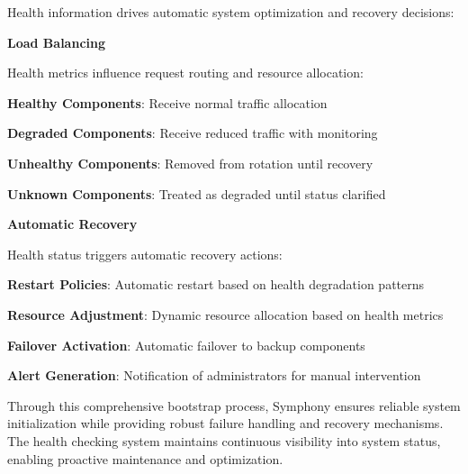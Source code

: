 Health information drives automatic system optimization and recovery decisions:

\textbf{Load Balancing}

Health metrics influence request routing and resource allocation:

\begin{compactlist}
    \item \textbf{Healthy Components}: Receive normal traffic allocation
    \item \textbf{Degraded Components}: Receive reduced traffic with monitoring
    \item \textbf{Unhealthy Components}: Removed from rotation until recovery
    \item \textbf{Unknown Components}: Treated as degraded until status clarified
\end{compactlist}

\textbf{Automatic Recovery}

Health status triggers automatic recovery actions:

\begin{compactlist}
    \item \textbf{Restart Policies}: Automatic restart based on health degradation patterns
    \item \textbf{Resource Adjustment}: Dynamic resource allocation based on health metrics
    \item \textbf{Failover Activation}: Automatic failover to backup components
    \item \textbf{Alert Generation}: Notification of administrators for manual intervention
\end{compactlist}

Through this comprehensive bootstrap process, Symphony ensures reliable system initialization while providing robust failure handling and recovery mechanisms. The health checking system maintains continuous visibility into system status, enabling proactive maintenance and optimization.